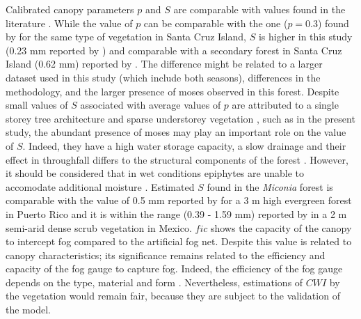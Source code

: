 \documentclass[a4paper,12pt]{article}
\begin{document}
Calibrated canopy parameters $p$ and $S$ are comparable with values found in the literature \citep{Aston1979, Lloydetal1988, WallaceandMcJannet2008, Takahashietal2011, Holwerdaetal2012}. While the value of $p$ can be comparable with the one ($p=0.3$) found by \cite{Pryetetal2012a} for the same type of vegetation in Santa Cruz Island, $S$ is higher in this study (0.23 mm reported by \cite{Pryetetal2012a}) and comparable with a secondary forest in Santa Cruz Island (0.62 mm) reported by \cite{Dominguezetal2016}. The difference might be related to a larger dataset used in this study (which include both seasons), differences in the methodology, and the larger presence of moses observed in this forest. Despite small values of $S$ associated with average values of $p$ are attributed to a single storey tree architecture and sparse understorey vegetation \citep{Pryetetal2012a}, such as in the present study, the abundant presence of moses may play an important role on the value of $S$. Indeed, they have a high water storage capacity, a slow drainage and their effect in throughfall differs to the structural components of the forest \citep{Richardsonetal2000, Kohleretal2007, Villegasetal2008}. However, it should be considered that in wet conditions epiphytes are unable to accomodate additional moisture \citep{Holscheretal2004}. Estimated $S$ found in the \textit{Miconia} forest is comparable with the value of 0.5 mm reported by \cite{Holwerdaetal2006} for a 3 m high evergreen forest in Puerto Rico and it is within the range (0.39 - 1.59 mm) reported by \cite{NavarndBryan1994} in a 2 m semi-arid dense scrub vegetation in Mexico. $fic$ shows the capacity of the canopy to intercept fog compared to the artificial fog net. Despite this value is related to canopy characteristics; its significance remains related to the efficiency and capacity of the fog gauge to capture fog. Indeed, the efficiency of the fog gauge depends on the type, material and form \citep{Villegasetal2008}. Nevertheless, estimations of $CWI$ by the vegetation would remain fair, because they are subject to the validation of the model. 
\end{document}
